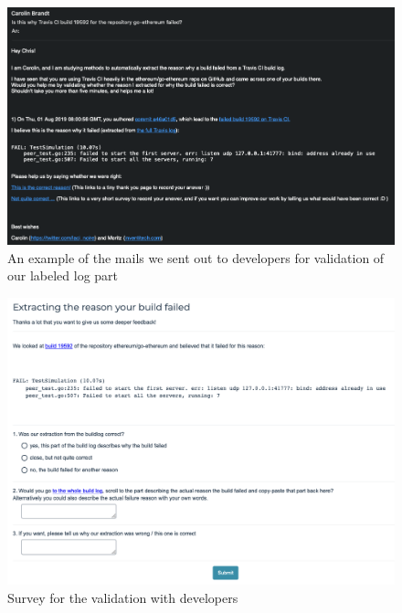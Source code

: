 \documentclass[\myrootdir/main.tex]{subfiles}
\begin{document}
\begin{figure}[h]
	\centering
	\includegraphics[width=\textwidth, clip]{img/dev-mail.png}
	\caption{An example of the mails we sent out to developers for validation of our labeled log part}
	\label{fig:dev-mail}
\end{figure}
\begin{figure}[h]
	\centering
	\includegraphics[width=\textwidth, clip]{img/dev-survey.png}
	\caption{Survey for the validation with developers}
	\label{fig:dev-survey}
\end{figure}
\end{document}
